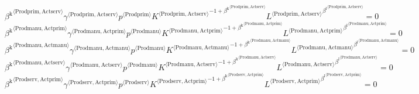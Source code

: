 \begin{equation}
{{\beta^{\mathrm{k}}}^{\langle \mathrm{\mathrm{Prodprim}},\mathrm{\mathrm{Actserv}}\rangle}} {{\gamma}^{\langle \mathrm{\mathrm{Prodprim}},\mathrm{\mathrm{Actserv}}\rangle}} {{p}^{\langle \mathrm{Prodprim}\rangle}} {{{K}^{\langle \mathrm{Prodprim},\mathrm{Actserv}\rangle}}^{-1 + {\beta^{\mathrm{k}}}^{\langle \mathrm{\mathrm{Prodprim}},\mathrm{\mathrm{Actserv}}\rangle}}} {{{L}^{\langle \mathrm{Prodprim},\mathrm{Actserv}\rangle}}^{{\beta^{\mathrm{l}}}^{\langle \mathrm{\mathrm{Prodprim}},\mathrm{\mathrm{Actserv}}\rangle}}} = 0
\end{equation}
\begin{equation}
{{\beta^{\mathrm{k}}}^{\langle \mathrm{\mathrm{Prodmanu}},\mathrm{\mathrm{Actprim}}\rangle}} {{\gamma}^{\langle \mathrm{\mathrm{Prodmanu}},\mathrm{\mathrm{Actprim}}\rangle}} {{p}^{\langle \mathrm{Prodmanu}\rangle}} {{{K}^{\langle \mathrm{Prodmanu},\mathrm{Actprim}\rangle}}^{-1 + {\beta^{\mathrm{k}}}^{\langle \mathrm{\mathrm{Prodmanu}},\mathrm{\mathrm{Actprim}}\rangle}}} {{{L}^{\langle \mathrm{Prodmanu},\mathrm{Actprim}\rangle}}^{{\beta^{\mathrm{l}}}^{\langle \mathrm{\mathrm{Prodmanu}},\mathrm{\mathrm{Actprim}}\rangle}}} = 0
\end{equation}
\begin{equation}
{{\beta^{\mathrm{k}}}^{\langle \mathrm{\mathrm{Prodmanu}},\mathrm{\mathrm{Actmanu}}\rangle}} {{\gamma}^{\langle \mathrm{\mathrm{Prodmanu}},\mathrm{\mathrm{Actmanu}}\rangle}} {{p}^{\langle \mathrm{Prodmanu}\rangle}} {{{K}^{\langle \mathrm{Prodmanu},\mathrm{Actmanu}\rangle}}^{-1 + {\beta^{\mathrm{k}}}^{\langle \mathrm{\mathrm{Prodmanu}},\mathrm{\mathrm{Actmanu}}\rangle}}} {{{L}^{\langle \mathrm{Prodmanu},\mathrm{Actmanu}\rangle}}^{{\beta^{\mathrm{l}}}^{\langle \mathrm{\mathrm{Prodmanu}},\mathrm{\mathrm{Actmanu}}\rangle}}} = 0
\end{equation}
\begin{equation}
{{\beta^{\mathrm{k}}}^{\langle \mathrm{\mathrm{Prodmanu}},\mathrm{\mathrm{Actserv}}\rangle}} {{\gamma}^{\langle \mathrm{\mathrm{Prodmanu}},\mathrm{\mathrm{Actserv}}\rangle}} {{p}^{\langle \mathrm{Prodmanu}\rangle}} {{{K}^{\langle \mathrm{Prodmanu},\mathrm{Actserv}\rangle}}^{-1 + {\beta^{\mathrm{k}}}^{\langle \mathrm{\mathrm{Prodmanu}},\mathrm{\mathrm{Actserv}}\rangle}}} {{{L}^{\langle \mathrm{Prodmanu},\mathrm{Actserv}\rangle}}^{{\beta^{\mathrm{l}}}^{\langle \mathrm{\mathrm{Prodmanu}},\mathrm{\mathrm{Actserv}}\rangle}}} = 0
\end{equation}
\begin{equation}
{{\beta^{\mathrm{k}}}^{\langle \mathrm{\mathrm{Prodserv}},\mathrm{\mathrm{Actprim}}\rangle}} {{\gamma}^{\langle \mathrm{\mathrm{Prodserv}},\mathrm{\mathrm{Actprim}}\rangle}} {{p}^{\langle \mathrm{Prodserv}\rangle}} {{{K}^{\langle \mathrm{Prodserv},\mathrm{Actprim}\rangle}}^{-1 + {\beta^{\mathrm{k}}}^{\langle \mathrm{\mathrm{Prodserv}},\mathrm{\mathrm{Actprim}}\rangle}}} {{{L}^{\langle \mathrm{Prodserv},\mathrm{Actprim}\rangle}}^{{\beta^{\mathrm{l}}}^{\langle \mathrm{\mathrm{Prodserv}},\mathrm{\mathrm{Actprim}}\rangle}}} = 0
\end{equation}
